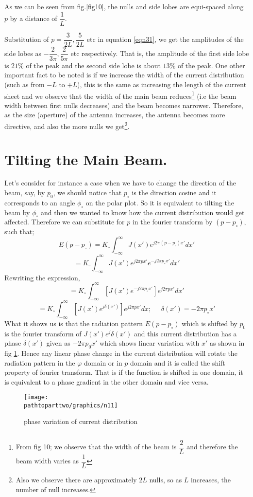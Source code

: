 As we can be seen from fig.\ref{fig10}, the nulls and side lobes are equi-spaced along $p$ by a distance of $\dfrac{1}{L}$.

Substitution of $p = \dfrac{3}{2L}, \dfrac{5}{2L}$ etc in equation \ref{eqn31}, we get the amplitudes of the side lobes as $-\dfrac{2}{3\pi}, \dfrac{2}{5\pi}$ etc respectively. That is, the amplitude of the first side lobe is $21\% $ of the peak and the second side lobe is about $13\%$ of the peak. One other important fact to be noted is if we increase the width of the current distribution (such as from $-L$ to $+L$), this is the same as increasing the length of the current sheet and we observe that the width of the main beam reduces\footnote{From fig 10; we observe that the width of the beam is $\dfrac{2}{L}$ and therefore the beam width varies as $\dfrac{1}{L}$} (i.e the beam width between first nulls decreases) and the beam becomes narrower. Therefore, as the size (aperture) of the antenna increases, the antenna becomes more directive, and also the more nulls we get\footnote{Also we observe there are approximately $2L$ nulls, so as $L$ increases, the number of null increases.}.

\section{Tilting the Main Beam.}
Let's consider for instance a case when we have to change the direction of the beam, say, by $p_0$, we should notice that $p_\circ$ is the direction cosine and it corresponds to an angle $\phi_\circ$ on the polar plot. So it is equivalent to tilting the beam by $\phi_\circ$ and then we wanted to know how the current distribution would get affected. Therefore we can substitute for $p$ in the fourier transform by $(p - p_\circ)$, such that;
$$E(p - p_\circ) = K_\circ\int_{-\infty}^{\infty} J(x') e^{j2\pi (p - p_\circ)x'} dx'$$
$$= K_\circ\int_{-\infty}^{\infty} J(x') e^{j2\pi px'}  e^{-j2\pi p_\circ x'} dx'$$
Rewriting the expression,
$$= K_\circ\int_{-\infty}^{\infty} [J(x') e^{-j2\pi p_\circ x'}] e^{j2\pi px'} dx'$$
$$ = K_\circ\int_{-\infty}^{\infty} [J(x') e^{j\delta (x')}] e^{j2\pi px'} dx ;\; \; \; \; \; \delta(x') = -2\pi p_\circ x'$$
What it shows us is that the radiation pattern $E(p - p_\circ)$ which is shifted by $p_0$ is the fourier transform of  $J(x')e^j\delta(x')$ and this current distribution has a phase $\delta(x')$ given as $-2\pi p_0x'$ which shows linear variation with $x'$ as shown in fig \ref{fig11}. Hence any linear phase change in the current distribution will rotate the radiation pattern in the $\varphi$ domain or in $p$ domain and it is called the shift property of fourier transform. That is if the function is shifted in one domain, it is equivalent to a phase gradient in the other domain and vice versa.
\begin{figure}[h]
\centering
\texttt{[image: \\pathtoparttwo/graphics/n11]}
\caption{phase variation of current distribution}
\label{fig11}
\end{figure}

